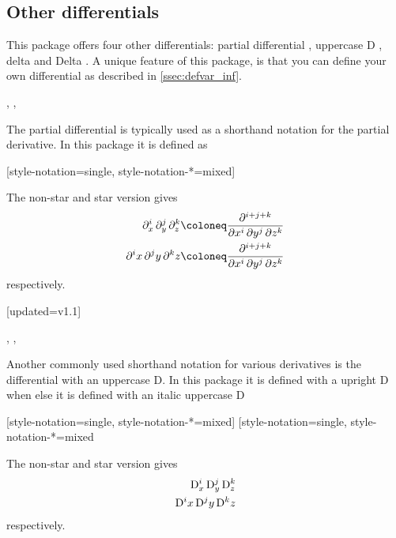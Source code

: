 	\subsection{Other differentials}
	This package offers four other differentials: partial differential \macro{\pdif}, uppercase D \macro{\mdif}, delta \macro{\fdif} and Delta \macro{\adif}. A unique feature of this package, is that you can define your own differential as described in \cref{ssec:defvar_inf}.
	
	\begin{function}{\pdif}
		\begin{syntax}
			\sarg, , 
		\end{syntax}
		The partial differential  is typically used as a shorthand notation for the partial derivative. In this package it is defined as
		
		\begin{definition}
			\DeclareDifferential{\pdif}{\partial}[style-notation=single,
			style-notation-*=mixed]
		\end{definition}
		
		\noindent The non-star and star version gives
		\begin{align*}
			\pdif[order={i,j,k}]{x,y,z} &\coloneq \pdv[order={i,j,k}]{}{x,y,z} \\
			\pdif*[order={i,j,k}]{x,y,z} &\coloneq \pdv[order={i,j,k}]{}{x,y,z}
		\end{align*}
		respectively.
	\end{function}
	
	\begin{function}{\mdif}[updated=v1.1]
		\begin{syntax}
			\sarg, , \marg{variables}
		\end{syntax}
		Another commonly used shorthand notation for various derivatives is the differential with an uppercase D. In this package it is defined with a upright D when  else it is defined with an italic uppercase D
		
		\begin{definition}
			[style-notation=single,
			style-notation-*=mixed]%
			[style-notation=single,
			style-notation-*=mixed%
		\end{definition}
		
		\noindent The non-star and star version gives
		\begin{align*}
			\mdif[order={i,j,k}]{x,y,z} \\
			\mdif*[order={i,j,k}]{x,y,z}
		\end{align*}
		respectively.
	\end{function}
	
